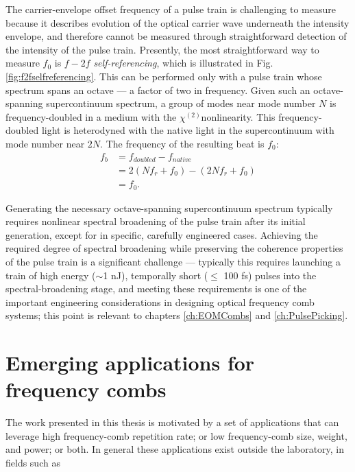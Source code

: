 The carrier-envelope offset frequency of a pulse train is challenging to measure because it describes evolution of the optical carrier wave underneath the intensity envelope, and therefore cannot be measured through straightforward detection of the intensity of the pulse train. Presently, the most straightforward way to measure $f_0$ is $f-2f$ \textit{self-referencing}, which is illustrated in Fig.\ref{fig:f2fselfreferencing}. This can be performed only with a pulse train whose spectrum spans an octave --- a factor of two in frequency. Given such an octave-spanning supercontinuum spectrum, a group of modes near mode number $N$ is frequency-doubled in a medium with the $\chi^{(2)}$nonlinearity. This frequency-doubled light is heterodyned with the native light in the supercontinuum with mode number near $2N$. The frequency of the resulting beat is $f_0$:
\begin{align}
f_b&=f_{doubled}-f_{native}\\
&=2(Nf_r+f_0)-(2Nf_r+f_0)\\
&=f_0.
\end{align}

Generating the necessary octave-spanning supercontinuum spectrum typically requires nonlinear spectral broadening of the pulse train after its initial generation, except for in specific, carefully engineered cases. Achieving the required degree of spectral broadening while preserving the coherence properties of the pulse train is a significant challenge --- typically this requires launching a train of high energy ($\sim$1 nJ), temporally short ($\leq$ 100 fs) pulses into the spectral-broadening stage, and meeting these requirements is one of the important engineering considerations in designing optical frequency comb systems; this point is relevant to chapters \ref{ch:EOMCombs} and \ref{ch:PulsePicking}. 

\section{Emerging applications for frequency combs}
The work presented in this thesis is motivated by a set of applications that can leverage high frequency-comb repetition rate; or low frequency-comb size, weight, and power; or both. In general these applications exist outside the laboratory, in fields such as 

